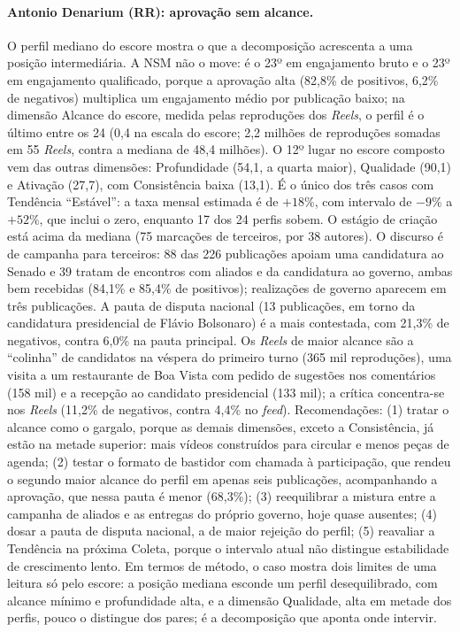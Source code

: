 \paragraph*{Antonio Denarium (RR): aprovação sem alcance.} O perfil mediano do escore mostra o que a decomposição acrescenta a uma posição intermediária. A NSM não o move: é o 23º em engajamento bruto e o 23º em engajamento qualificado, porque a aprovação alta (82,8\% de positivos, 6,2\% de negativos) multiplica um engajamento médio por publicação baixo; na dimensão Alcance do escore, medida pelas reproduções dos \emph{Reels}, o perfil é o último entre os 24 (0,4 na escala do escore; 2,2 milhões de reproduções somadas em 55 \emph{Reels}, contra a mediana de 48,4 milhões). O 12º lugar no escore composto vem das outras dimensões: Profundidade (54,1, a quarta maior), Qualidade (90,1) e Ativação (27,7), com Consistência baixa (13,1). É o único dos três casos com Tendência ``Estável'': a taxa mensal estimada é de $+18\%$, com intervalo de $-9\%$ a $+52\%$, que inclui o zero, enquanto 17 dos 24 perfis sobem. O estágio de criação está acima da mediana (75 marcações de terceiros, por 38 autores). O discurso é de campanha para terceiros: 88 das 226 publicações apoiam uma candidatura ao Senado e 39 tratam de encontros com aliados e da candidatura ao governo, ambas bem recebidas (84,1\% e 85,4\% de positivos); realizações de governo aparecem em três publicações. A pauta de disputa nacional (13 publicações, em torno da candidatura presidencial de Flávio Bolsonaro) é a mais contestada, com 21,3\% de negativos, contra 6,0\% na pauta principal. Os \emph{Reels} de maior alcance são a ``colinha'' de candidatos na véspera do primeiro turno (365 mil reproduções), uma visita a um restaurante de Boa Vista com pedido de sugestões nos comentários (158 mil) e a recepção ao candidato presidencial (133 mil); a crítica concentra-se nos \emph{Reels} (11,2\% de negativos, contra 4,4\% no \emph{feed}). Recomendações: (1) tratar o alcance como o gargalo, porque as demais dimensões, exceto a Consistência, já estão na metade superior: mais vídeos construídos para circular e menos peças de agenda; (2) testar o formato de bastidor com chamada à participação, que rendeu o segundo maior alcance do perfil em apenas seis publicações, acompanhando a aprovação, que nessa pauta é menor (68,3\%); (3) reequilibrar a mistura entre a campanha de aliados e as entregas do próprio governo, hoje quase ausentes; (4) dosar a pauta de disputa nacional, a de maior rejeição do perfil; (5) reavaliar a Tendência na próxima Coleta, porque o intervalo atual não distingue estabilidade de crescimento lento. Em termos de método, o caso mostra dois limites de uma leitura só pelo escore: a posição mediana esconde um perfil desequilibrado, com alcance mínimo e profundidade alta, e a dimensão Qualidade, alta em metade dos perfis, pouco o distingue dos pares; é a decomposição que aponta onde intervir.


